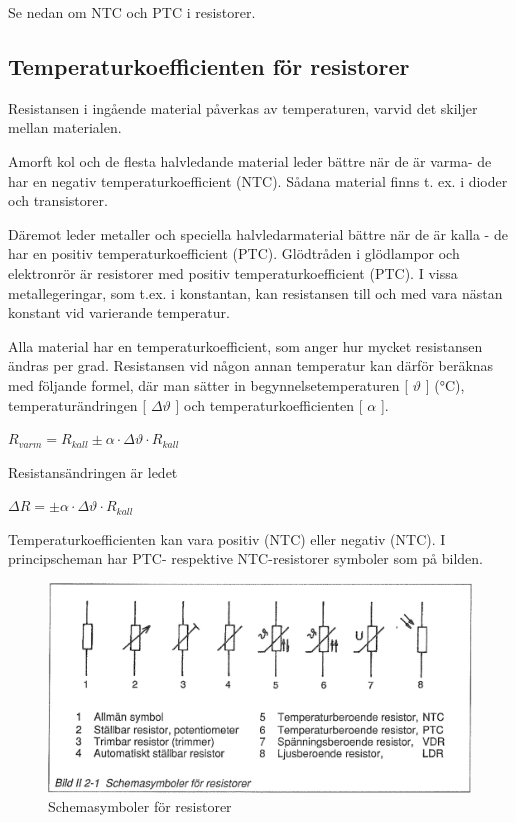 Se nedan om NTC och PTC i resistorer.

\subsection{Temperaturkoefficienten för resistorer}

Resistansen i ingående material påverkas av temperaturen, varvid det skiljer
mellan materialen.

Amorft kol och de flesta halvledande material leder bättre när de är varma- de
har en negativ temperaturkoefficient (NTC). Sådana material finns t. ex. i
dioder och transistorer.

Däremot leder metaller och speciella halvledarmaterial bättre när de är kalla -
de har en positiv temperaturkoefficient (PTC). Glödtråden i glödlampor och
elektronrör är resistorer med positiv temperaturkoefficient (PTC). I vissa
metallegeringar, som t.ex. i konstantan, kan resistansen till och med vara
nästan konstant vid varierande temperatur.

Alla material har en temperaturkoefficient, som anger hur mycket resistansen
ändras per grad. Resistansen vid någon annan temperatur kan därför beräknas med
följande formel, där man sätter in begynnelsetemperaturen [ \(\vartheta\) ]
(°C), temperaturändringen [ \(\Delta \vartheta\) ] och
temperaturkoefficienten [ \(\alpha\) ].

\(R_{varm} = R_{kall} \pm \alpha \cdot \Delta \vartheta \cdot R_{kall}\)

Resistansändringen är ledet

\( \Delta R = \pm \alpha \cdot \Delta \vartheta \cdot R_{kall}\)

Temperaturkoefficienten kan vara positiv (NTC) eller negativ (NTC).
I principscheman har PTC- respektive NTC-resistorer symboler som på bilden.

\begin{figure}
\includegraphics[width=\textwidth]{images/bild_2_2-01}
\caption{Schemasymboler för resistorer}
\label{fig:BildII2-1}
\end{figure}

